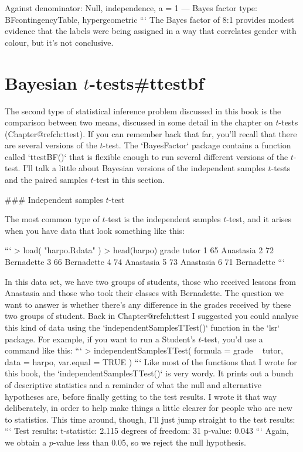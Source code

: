Against denominator:
  Null, independence, a = 1 
---
Bayes factor type: BFcontingencyTable, hypergeometric
```
The Bayes factor of 8:1 provides modest evidence that the labels were being assigned in a way that correlates gender with colour, but it's not conclusive.




\section{Bayesian $t$-tests{#ttestbf}}

The second type of statistical inference problem discussed in this book is the comparison between two means, discussed in some detail in the chapter on $t$-tests (Chapter@refch:ttest). If you can remember back that far, you'll recall that there are several versions of the $t$-test. The `BayesFactor` package contains a function called `ttestBF()` that is flexible enough to run several different versions of the $t$-test. I'll talk a little about Bayesian versions of the independent samples $t$-tests and the paired samples $t$-test in this section. 

### Independent samples $t$-test

The most common type of $t$-test is the independent samples $t$-test, and it arises when you have data that look something like this:

```
> load( "harpo.Rdata" )
> head(harpo)
  grade      tutor
1    65  Anastasia
2    72 Bernadette
3    66 Bernadette
4    74  Anastasia
5    73  Anastasia
6    71 Bernadette
```


In this data set, we have two groups of students, those who received lessons from Anastasia and those who took their classes with Bernadette. The question we want to answer is whether there's any difference in the grades received by these two groups of student. Back in Chapter@refch:ttest I suggested you could analyse this kind of data using the `independentSamplesTTest()` function in the `lsr` package. For example, if you want to run a Student's $t$-test, you'd use a command like this:
```
> independentSamplesTTest(
    formula = grade ~ tutor, 
    data = harpo, 
    var.equal = TRUE 
 )
```
Like most of the functions that I wrote for this book, the `independentSamplesTTest()` is very wordy. It prints out a bunch of descriptive statistics and a reminder of what the null and alternative hypotheses are, before finally getting to the test results. I wrote it that way deliberately, in order to help make things a little clearer for people who are new to statistics. This time around, though, I'll just jump straight to the test results:
```
Test results: 
   t-statistic:  2.115 
   degrees of freedom:  31 
   p-value:  0.043 
```
Again, we obtain a $p$-value less than 0.05, so we reject the null hypothesis. 

